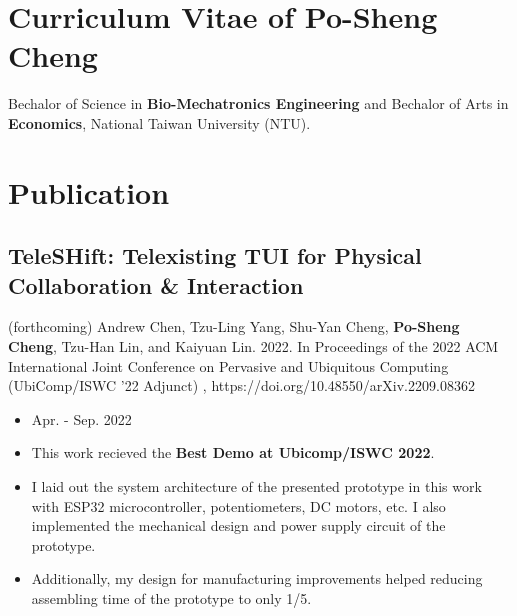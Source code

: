 \documentclass[12pt]{article}
\begin{document}
    \section*{Curriculum Vitae of Po-Sheng Cheng} 
    {\sffamily
    Bechalor of Science in \textbf{Bio-Mechatronics Engineering} and Bechalor of Arts in \textbf{Economics}, National Taiwan University (NTU).
    }
    \section*{Publication}
        \subsection*{TeleSHift: Telexisting TUI for Physical Collaboration \& Interaction}
        {\sffamily
        {\footnotesize (forthcoming) Andrew Chen, Tzu-Ling Yang, Shu-Yan Cheng, \textbf{Po-Sheng Cheng}, Tzu-Han Lin, and Kaiyuan Lin. 2022. In Proceedings of the 2022 ACM International Joint Conference on Pervasive and Ubiquitous Computing (UbiComp/ISWC '22 Adjunct)%
        , https://doi.org/10.48550/arXiv.2209.08362}
        \begin{itemize}
            \item Apr. - Sep. 2022
            \item This work recieved the \textbf{Best Demo at Ubicomp/ISWC 2022}.
            \item I laid out the system architecture of the presented prototype in this work with ESP32 microcontroller, potentiometers, DC motors, etc. I also implemented the mechanical design and power supply circuit of the prototype.
            \item Additionally, my design for manufacturing improvements helped reducing assembling time of the prototype to only 1/5.
        \end{itemize}
        }
\end{document}
